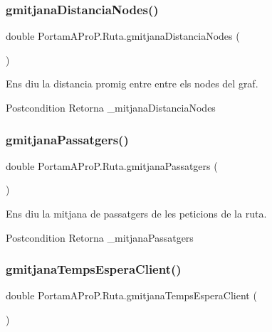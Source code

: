\subsubsection{\texorpdfstring{gmitjana\+Distancia\+Nodes()}{gmitjanaDistanciaNodes()}}
{\footnotesize\ttfamily double Portam\+A\+Pro\+P.\+Ruta.\+gmitjana\+Distancia\+Nodes (\begin{DoxyParamCaption}{ }\end{DoxyParamCaption})}



Ens diu la distancia promig entre entre els nodes del graf. 

\begin{DoxyPostcond}{Postcondition}
Retorna \+\_\+mitjana\+Distancia\+Nodes 
\end{DoxyPostcond}
\mbox{\label{class_portam_a_pro_p_1_1_ruta_acef34ba8914120054ac66f585072cbc4}} 
\subsubsection{\texorpdfstring{gmitjana\+Passatgers()}{gmitjanaPassatgers()}}
{\footnotesize\ttfamily double Portam\+A\+Pro\+P.\+Ruta.\+gmitjana\+Passatgers (\begin{DoxyParamCaption}{ }\end{DoxyParamCaption})}



Ens diu la mitjana de passatgers de les peticions de la ruta. 

\begin{DoxyPostcond}{Postcondition}
Retorna \+\_\+mitjana\+Passatgers 
\end{DoxyPostcond}
\mbox{\label{class_portam_a_pro_p_1_1_ruta_a7668f7adc193b9b23d315ca48141ab71}} 
\subsubsection{\texorpdfstring{gmitjana\+Temps\+Espera\+Client()}{gmitjanaTempsEsperaClient()}}
{\footnotesize\ttfamily double Portam\+A\+Pro\+P.\+Ruta.\+gmitjana\+Temps\+Espera\+Client (\begin{DoxyParamCaption}{ }\end{DoxyParamCaption})}



